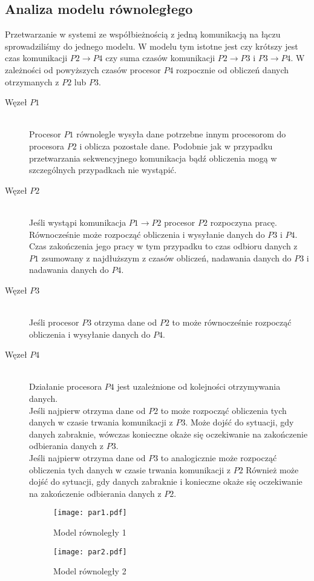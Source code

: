 \subsection{Analiza modelu równoległego}

Przetwarzanie w systemi ze współbieżnością z jedną komunikacją na łączu sprowadziliśmy do jednego modelu.
W modelu tym istotne jest czy krótszy jest czas komunikacji $P2 \to P4$ czy suma czasów komunikacji $P2 \to P3$ i $P3 \to P4$.
W zależności od powyższych czasów procesor $P4$ rozpocznie od obliczeń danych otrzymanych z $P2$ lub $P3$.

\begin{description}

\item[Węzeł $P1$] \hfill \\

Procesor $P1$ równolegle wysyła dane potrzebne innym procesorom do procesora $P2$ i oblicza pozostałe dane.
Podobnie jak w przypadku przetwarzania sekwencyjnego komunikacja bądź obliczenia mogą w szczególnych przypadkach nie wystąpić.

\item[Węzeł $P2$] \hfill \\

Jeśli wystąpi komunikacja $P1 \to P2$ procesor $P2$ rozpoczyna pracę. Równocześnie może rozpocząć obliczenia i wysyłanie danych do $P3$ i $P4$.
Czas zakończenia jego pracy w tym przypadku to czas odbioru danych z $P1$ zsumowany z najdłuższym z czasów obliczeń, nadawania danych do $P3$ i nadawania danych do $P4$.

\item[Węzeł $P3$] \hfill \\

Jeśli procesor $P3$ otrzyma dane od $P2$ to może równocześnie rozpocząć obliczenia i wysyłanie danych do $P4$.

\item[Węzeł $P4$] \hfill \\

Działanie procesora $P4$ jest uzależnione od kolejności otrzymywania danych. \\

Jeśli najpierw otrzyma dane od $P2$ to może rozpocząć obliczenia tych danych w czasie trwania komunikacji z $P3$.
Może dojść do sytuacji, gdy danych zabraknie, wówczas konieczne okaże się oczekiwanie na zakończenie odbierania danych z $P3$. \\

Jeśli najpierw otrzyma dane od $P3$ to analogicznie może rozpocząć obliczenia tych danych w czasie trwania komunikacji z $P2$
Również może dojść do sytuacji, gdy danych zabraknie i konieczne okaże się oczekiwanie na zakończenie odbierania danych z $P2$.

\begin{figure}[!ht]
\centering
\texttt{[image: par1.pdf]}
\caption{Model równoległy 1}
\label{fig:seq1}
\end{figure}

\begin{figure}[!ht]
\centering
\texttt{[image: par2.pdf]}
\caption{Model równoległy 2}
\label{fig:seq1}
\end{figure}

\end{description}

